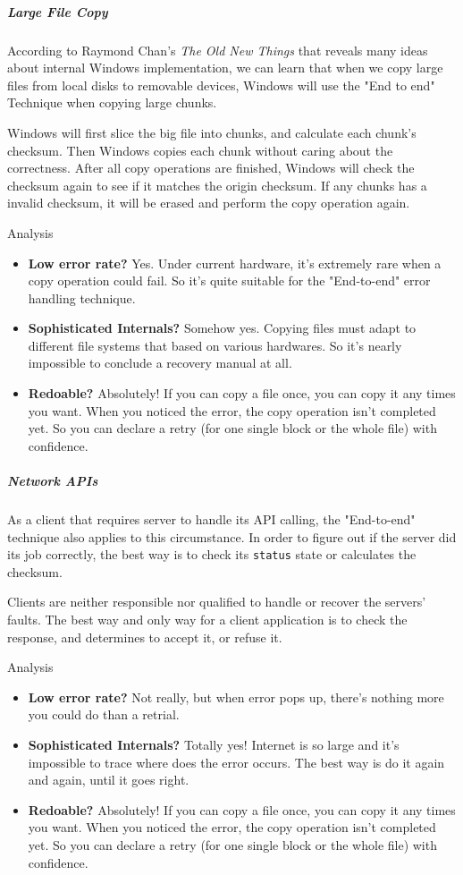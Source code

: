 \documentclass[
]{article}
\begin{document}
\hypertarget{header-n31}{%
\subparagraph{Large File Copy}\label{header-n31}}

According to Raymond Chan's \emph{The Old New Things} that reveals many
ideas about internal Windows implementation, we can learn that when we
copy large files from local disks to removable devices, Windows will use
the "End to end" Technique when copying large chunks.

Windows will first slice the big file into chunks, and calculate each
chunk's checksum. Then Windows copies each chunk without caring about
the correctness. After all copy operations are finished, Windows will
check the checksum again to see if it matches the origin checksum. If
any chunks has a invalid checksum, it will be erased and perform the
copy operation again.

Analysis

\begin{itemize}
\item
  \textbf{Low error rate?} Yes. Under current hardware, it's extremely
  rare when a copy operation could fail. So it's quite suitable for the
  "End-to-end" error handling technique.
\item
  \textbf{Sophisticated Internals?} Somehow yes. Copying files must
  adapt to different file systems that based on various hardwares. So
  it's nearly impossible to conclude a recovery manual at all.
\item
  \textbf{Redoable?} Absolutely! If you can copy a file once, you can
  copy it any times you want. When you noticed the error, the copy
  operation isn't completed yet. So you can declare a retry (for one
  single block or the whole file) with confidence.
\end{itemize}

\hypertarget{header-n60}{%
\subparagraph{Network APIs}\label{header-n60}}

As a client that requires server to handle its API calling, the
"End-to-end" technique also applies to this circumstance. In order to
figure out if the server did its job correctly, the best way is to check
its \texttt{status} state or calculates the checksum.

Clients are neither responsible nor qualified to handle or recover the
servers' faults. The best way and only way for a client application is
to check the response, and determines to accept it, or refuse it.

Analysis

\begin{itemize}
\item
  \textbf{Low error rate?} Not really, but when error pops up, there's
  nothing more you could do than a retrial.
\item
  \textbf{Sophisticated Internals?} Totally yes! Internet is so large
  and it's impossible to trace where does the error occurs. The best way
  is do it again and again, until it goes right.
\item
  \textbf{Redoable?} Absolutely! If you can copy a file once, you can
  copy it any times you want. When you noticed the error, the copy
  operation isn't completed yet. So you can declare a retry (for one
  single block or the whole file) with confidence.
\end{itemize}
\end{document}
